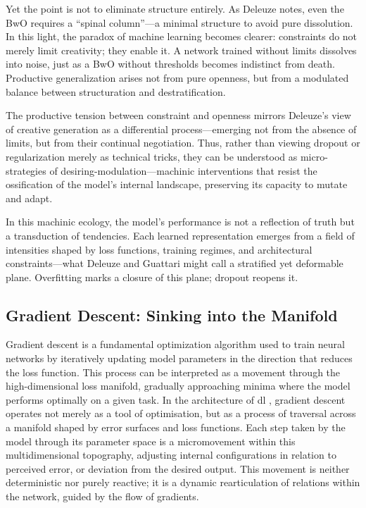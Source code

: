 Yet the point is not to eliminate structure entirely. As Deleuze notes, even the BwO requires a “spinal column”—a minimal structure to avoid pure dissolution. In this light, the paradox of machine learning becomes clearer: constraints do not merely limit creativity; they enable it. A network trained without limits dissolves into noise, just as a BwO without thresholds becomes indistinct from death. Productive generalization arises not from pure openness, but from a modulated balance between structuration and destratification.

The productive tension between constraint and openness mirrors Deleuze’s view of creative generation as a differential process—emerging not from the absence of limits, but from their continual negotiation. Thus, rather than viewing dropout or regularization merely as technical tricks, they can be understood as micro-strategies of desiring-modulation—machinic interventions that resist the ossification of the model’s internal landscape, preserving its capacity to mutate and adapt.

In this machinic ecology, the model’s performance is not a reflection of truth but a transduction of tendencies. Each learned representation emerges from a field of intensities shaped by loss functions, training regimes, and architectural constraints—what Deleuze and Guattari might call a stratified yet deformable plane. Overfitting marks a closure of this plane; dropout reopens it.

\subsection{Gradient Descent: Sinking into the Manifold}

Gradient descent is a fundamental optimization algorithm used to train neural networks by iteratively updating model parameters in the direction that reduces the loss function. This process can be interpreted as a movement through the high-dimensional loss manifold, gradually approaching minima where the model performs optimally on a given task. In the architecture of \gls{dl} , gradient descent operates not merely as a tool of optimisation, but as a process of traversal across a manifold shaped by error surfaces and loss functions. Each step taken by the model through its parameter space is a micromovement within this multidimensional topography, adjusting internal configurations in relation to perceived error, or deviation from the desired output. This movement is neither deterministic nor purely reactive; it is a dynamic rearticulation of relations within the network, guided by the flow of gradients.


